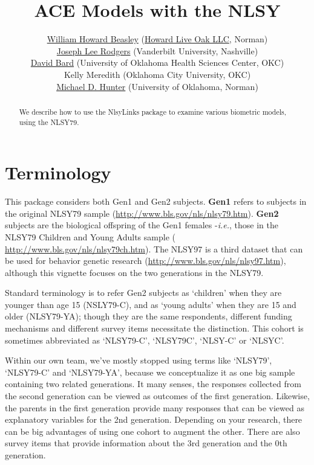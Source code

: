 \documentclass{article}\usepackage[]{graphicx}\usepackage[]{color}
\title{ACE Models with the NLSY}
\author{
  \href{http://scholar.google.com/citations?user=ffsJTC0AAAAJ}{William Howard Beasley} (\href{http://howardliveoak.com/}{Howard Live Oak LLC}, Norman)\\
  \href{http://www.vanderbilt.edu/psychological_sciences/bio/joe-rodgers}{Joseph Lee Rodgers} (Vanderbilt University, Nashville)\\
  \href{http://find.ouhsc.edu/Faculty.aspx?FacultyID=1041}{David Bard} (University of Oklahoma Health Sciences Center, OKC)\\
  Kelly Meredith (Oklahoma City University, OKC)\\
  \href{http://students.ou.edu/H/Michael.D.Hunter-1/}{Michael D. Hunter} (University of Oklahoma, Norman)
}
\begin{document}
\newcommand{\code}[1]{\texttt{\small{#1}}}
\newcommand{\pkg}[1]{\textsf{\small{#1}}}
\newcommand{\R}{\textsf{R}} %

\maketitle

\begin{abstract}
   We describe how to use the \pkg{NlsyLinks} package to examine various biometric models, using the NLSY79.
\end{abstract}
\tableofcontents




\section{Terminology} %
This package considers both Gen1 and Gen2 subjects.  \textbf{Gen1} refers to subjects in the original NLSY79 sample (\url{http://www.bls.gov/nls/nlsy79.htm}).  \textbf{Gen2} subjects are the biological offspring of the Gen1 females -\emph{i.e.}, those in the NLSY79 Children and Young Adults sample ( \url{http://www.bls.gov/nls/nlsy79ch.htm}).  The NLSY97 is a third dataset that can be used for behavior genetic research (\url{http://www.bls.gov/nls/nlsy97.htm}), although this vignette focuses on the two generations in the NLSY79.

Standard terminology is to refer Gen2 subjects as `children' when they are younger than age 15 (NSLY79-C), and as `young adults' when they are 15 and older (NLSY79-YA); though they are the same respondents, different funding mechanisms and different survey items necessitate the distinction.  This cohort is sometimes abbreviated as `NLSY79-C', `NLSY79C', `NLSY-C' or `NLSYC'. 

Within our own team, we've mostly stopped using terms like `NLSY79', `NLSY79-C' and `NLSY79-YA', because we conceptualize it as one big sample containing two related generations.  It many senses, the responses collected from the second generation can be viewed as outcomes of the first generation.  Likewise, the parents in the first generation provide many responses that can be viewed as explanatory variables for the 2nd generation.  Depending on your research, there can be big advantages of using one cohort to augment the other.  There are also survey items that provide information about the 3rd generation and the 0th generation.
\end{document}
